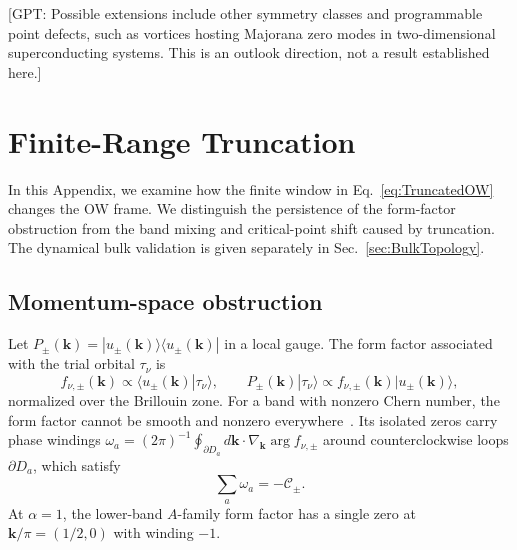 \documentclass[aps,prb,10pt,twocolumn,superscriptaddress,longbibliography,floatfix]{revtex4-2}
\newcommand{\mc}[1]{\mathcal{#1}}
\newcommand{\bk}{\boldsymbol k}
\newcommand{\GPT}[1]{{\color{magenta}[GPT: #1]}}
\begin{document}
\GPT{Possible extensions include other symmetry classes and programmable point defects, such as vortices hosting Majorana zero modes in two-dimensional superconducting systems. This is an outlook direction, not a result established here.}


\FloatBarrier
\appendix
\setcounter{figure}{0}
\renewcommand{\thefigure}{A\arabic{figure}}
\renewcommand{\theHfigure}{A\arabic{figure}}

{\color{blue}\section{Finite-Range Truncation}
\label{app:Truncation}}

{\color{blue}
In this Appendix, we examine how the finite window in Eq.~\eqref{eq:TruncatedOW} changes the OW frame. We distinguish the persistence of the form-factor obstruction from the band mixing and critical-point shift caused by truncation. The dynamical bulk validation is given separately in Sec.~\ref{sec:BulkTopology}.
}

\subsection{Momentum-space obstruction}

Let $P_\pm(\bk)=|u_\pm(\bk)\rangle\langle u_\pm(\bk)|$ in a local gauge. The form factor associated with the trial orbital $\tau_\nu$ is
\begin{equation}
    f_{\nu,\pm}(\bk)\propto\langle u_\pm(\bk)|\tau_\nu\rangle,
    \qquad
    P_\pm(\bk)|\tau_\nu\rangle\propto f_{\nu,\pm}(\bk)|u_\pm(\bk)\rangle,
    \label{eq:FormFactor}
\end{equation}
normalized over the Brillouin zone. For a band with nonzero Chern number, the form factor cannot be smooth and nonzero everywhere~\cite{BhuiyanPanJian2026}. Its isolated zeros carry phase windings $\omega_a=(2\pi)^{-1}\oint_{\partial D_a}d\bk\cdot\nabla_{\bk}\arg f_{\nu,\pm}$ around counterclockwise loops $\partial D_a$, which satisfy
\begin{equation}
    \sum_a\omega_a=-\mc C_\pm.
    \label{eq:ZeroWinding}
\end{equation}
At $\alpha=1$, the lower-band $A$-family form factor has a single zero at $\bk/\pi=(1/2,0)$ with winding $-1$.
\end{document}
